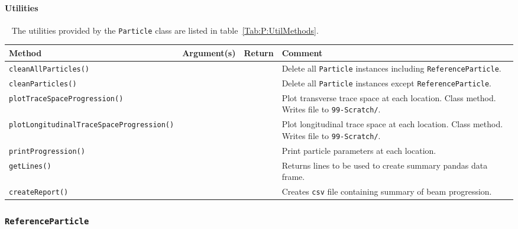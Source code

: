 \paragraph{Utilities} ~\newline
\noindent
The utilities provided by the \texttt{Particle} class are listed in
table~\ref{Tab:P:UtilMethods}.
\begin{sidewaystable}[h]
  \caption{
    Utilities provided by the \texttt{Particle}
    class. 
  }
  \label{Tab:P:UtilMethods}
  \begin{center}
    \begin{tabular}{|l|c|c|p{10cm}|}
      \hline
      \textbf{Method} & \textbf{Argument(s)} & \textbf{Return} & \textbf{Comment}                                          \\
      \hline
      \texttt{cleanAllParticles()}&  &  & Delete all \texttt{Particle} instances including \texttt{ReferenceParticle}.     \\
      \texttt{cleanParticles()}   &  &  & Delete all \texttt{Particle} instances except \texttt{ReferenceParticle}.        \\
      \texttt{plotTraceSpaceProgression()} &  &  & Plot transverse trace space at each location.  Class method.  Writes file to
                                                   \texttt{99-Scratch/}.                                                   \\
      \texttt{plotLongitudinalTraceSpaceProgression()} &  &  & Plot longitudinal trace space at each location.  Class method.  Writes file to
                                                   \texttt{99-Scratch/}.                                                   \\
      \texttt{printProgression()} &  &  & Print particle parameters at each location.                      \\
      \texttt{getLines()}         &  &  & Returns lines to be used to create summary pandas data frame.                    \\
      \texttt{createReport()}     &  &  & Creates \texttt{csv} file containing summary of beam progression.                \\
      \hline
    \end{tabular}
  \end{center}
\end{sidewaystable}

\FloatBarrier

\subsubsection{\texttt{ReferenceParticle}} ~\newline
\label{SubSubSect:BLE:ReferenceParticle}

